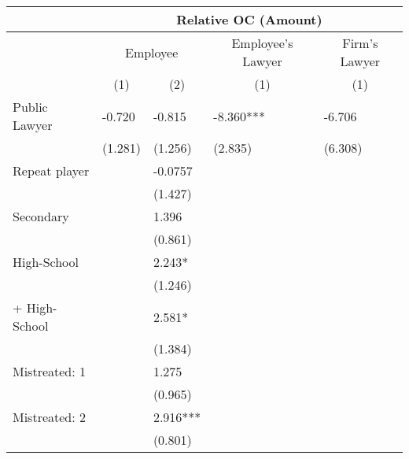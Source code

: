 \begin{tabular}{lrrrr}
\toprule
      & \multicolumn{4}{c}{Relative OC (Amount)} \\
\midrule
      & \multicolumn{2}{c}{Employee} & \multicolumn{1}{c}{Employee's Lawyer} & \multicolumn{1}{c}{Firm's  Lawyer} \\
      & \multicolumn{1}{c}{(1)} & \multicolumn{1}{c}{(2)} & \multicolumn{1}{c}{(1)} & \multicolumn{1}{c}{(1)} \\
Public Lawyer & \multicolumn{1}{l}{-0.720} & \multicolumn{1}{l}{-0.815} & \multicolumn{1}{l}{-8.360***} & \multicolumn{1}{l}{-6.706} \\
      & \multicolumn{1}{l}{(1.281)} & \multicolumn{1}{l}{(1.256)} & \multicolumn{1}{l}{(2.835)} & \multicolumn{1}{l}{(6.308)} \\
Repeat player & \multicolumn{1}{l}{} & \multicolumn{1}{l}{-0.0757} & \multicolumn{1}{l}{} & \multicolumn{1}{l}{} \\
      & \multicolumn{1}{l}{} & \multicolumn{1}{l}{(1.427)} & \multicolumn{1}{l}{} & \multicolumn{1}{l}{} \\
Secondary & \multicolumn{1}{l}{} & \multicolumn{1}{l}{1.396} & \multicolumn{1}{l}{} & \multicolumn{1}{l}{} \\
      & \multicolumn{1}{l}{} & \multicolumn{1}{l}{(0.861)} & \multicolumn{1}{l}{} & \multicolumn{1}{l}{} \\
High-School & \multicolumn{1}{l}{} & \multicolumn{1}{l}{2.243*} & \multicolumn{1}{l}{} & \multicolumn{1}{l}{} \\
      & \multicolumn{1}{l}{} & \multicolumn{1}{l}{(1.246)} & \multicolumn{1}{l}{} & \multicolumn{1}{l}{} \\
+ High-School & \multicolumn{1}{l}{} & \multicolumn{1}{l}{2.581*} & \multicolumn{1}{l}{} & \multicolumn{1}{l}{} \\
      & \multicolumn{1}{l}{} & \multicolumn{1}{l}{(1.384)} & \multicolumn{1}{l}{} & \multicolumn{1}{l}{} \\
Mistreated: 1 & \multicolumn{1}{l}{} & \multicolumn{1}{l}{1.275} & \multicolumn{1}{l}{} & \multicolumn{1}{l}{} \\
      & \multicolumn{1}{l}{} & \multicolumn{1}{l}{(0.965)} & \multicolumn{1}{l}{} & \multicolumn{1}{l}{} \\
Mistreated: 2 & \multicolumn{1}{l}{} & \multicolumn{1}{l}{2.916***} & \multicolumn{1}{l}{} & \multicolumn{1}{l}{} \\
      & \multicolumn{1}{l}{} & \multicolumn{1}{l}{(0.801)} & \multicolumn{1}{l}{} & \multicolumn{1}{l}{} \\

\end{tabular}
